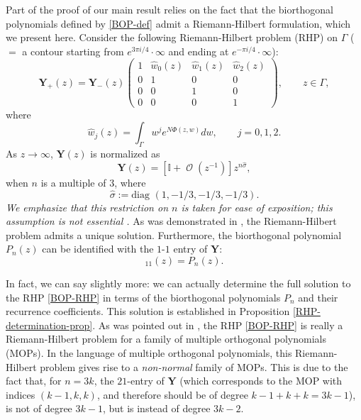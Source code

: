 \documentclass[usenames,dvipsnames]{article}
\theoremstyle{definition}
\DeclareMathOperator{\OO}{\mathcal{O}}
\numberwithin{equation}{section}
\numberwithin{figure}{section}
\begin{document}
Part of the proof of our main result relies on the fact \cite{KM} that the biorthogonal polynomials defined by \eqref{BOP-def} admit a Riemann-Hilbert formulation, which we present here. Consider the following Riemann-Hilbert problem (RHP) on $\Gamma$ ($=$ a contour starting from $e^{3\pi i/4}\cdot\infty$ and ending at $e^{-\pi i/4}\cdot \infty$):
    \begin{equation}\label{BOP-RHP}
        \boldsymbol{Y}_+(z) = \boldsymbol{Y}_-(z)
        \begin{pmatrix}
            1 & \hat{w}_0(z) & \hat{w}_1(z) & \hat{w}_2(z)\\
            0 & 1 & 0 & 0\\
            0 & 0 & 1 & 0\\
            0 & 0 & 0 & 1
        \end{pmatrix}, \qquad z\in \Gamma,
    \end{equation}
where
    \begin{equation}
        \hat{w}_j(z) = \int_{\Gamma} w^j e^{N\Phi(z,w)} dw, \qquad j=0,1,2.
    \end{equation}
As $z\to \infty$, $\mathbf{Y}(z)$ is normalized as
    \begin{equation}\label{BOP-normalization}
        \boldsymbol{Y}(z) = \left[\mathbb{I}+ \OO(z^{-1})\right]z^{n\hat{\sigma}},
    \end{equation}
when $n$ is a multiple of $3$, where
    \begin{equation}\label{hat-sigma-def}
        \hat{\sigma} := \text{diag }(1,-1/3,-1/3,-1/3).
    \end{equation}
\textit{We emphasize that this restriction on $n$ is taken for ease of exposition; this assumption is not essential \cite{DK1,DKM,DHL1}.} As was demonstrated in \cite{KM}, the Riemann-Hilbert problem admits a unique solution. Furthermore, the biorthogonal polynomial $P_n(z)$ can be identified with the $1$-$1$ entry of $\boldsymbol{Y}$:
    \begin{equation}
        [\boldsymbol{Y}]_{11}(z) = P_n(z).
    \end{equation}


    In fact, we can say slightly more: we can actually determine the full solution to the RHP \eqref{BOP-RHP} in terms of the biorthogonal polynomials $P_n$ and their recurrence coefficients. This solution is established in Proposition \ref{RHP-determination-prop}. As was pointed out in \cite{KM}, the RHP \eqref{BOP-RHP} is really a Riemann-Hilbert problem for a family of multiple orthogonal polynomials (MOPs). In the language of multiple orthogonal polynomials, this Riemann-Hilbert problem gives rise to a \textit{non-normal} family of MOPs. This is due to the fact that, for $n=3k$, the $21$-entry of $\boldsymbol{Y}$ (which corresponds to the MOP with indices $(k-1,k,k)$, and therefore should be of degree $k-1+k+k=3k-1$), is not of degree $3k-1$, but is instead of degree $3k-2$. 
\end{document}
